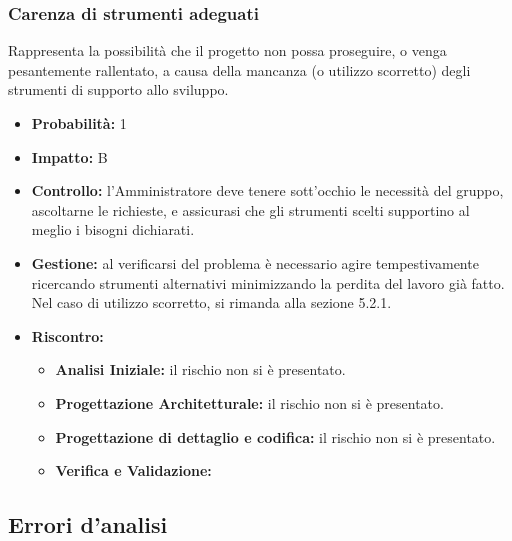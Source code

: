 \documentclass[a4paper,11pt]{article}
\begin{document}
		\subsubsection{Carenza di strumenti adeguati}
		Rappresenta la possibilità che il progetto non possa proseguire, o venga pesantemente rallentato, a causa della mancanza (o utilizzo scorretto) degli strumenti di supporto allo sviluppo.
		\begin{itemize}
		\item \textbf{Probabilità: }1
		\item \textbf{Impatto: }B
		\item \textbf{Controllo:} l'Amministratore deve tenere sott'occhio le necessità  del gruppo, ascoltarne le richieste, e assicurasi che gli strumenti scelti supportino al meglio i bisogni dichiarati.
		\item \textbf{Gestione:} al verificarsi del problema è necessario agire tempestivamente ricercando strumenti alternativi minimizzando la perdita del lavoro già fatto. Nel caso di utilizzo scorretto, si rimanda alla sezione 5.2.1.
		\item \textbf{Riscontro:}
			\begin{itemize}
				\item\textbf{Analisi Iniziale:} il rischio non si è presentato.
				\item\textbf{Progettazione Architetturale:} il rischio non si è presentato.
				\item\textbf{Progettazione di dettaglio e codifica:} il rischio non si è presentato.
				\item\textbf{Verifica e Validazione:}
			\end{itemize}
		\end{itemize}
	\subsection{Errori d'analisi} \label{risk: errori}
\end{document}
